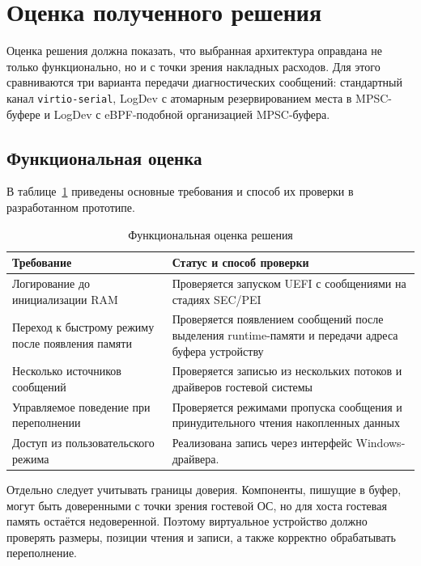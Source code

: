 \section{Оценка полученного решения}
\label{sec:Chapter5} 

Оценка решения должна показать, что выбранная архитектура оправдана не только
функционально, но и с точки зрения накладных расходов. Для этого сравниваются
три варианта передачи диагностических сообщений: стандартный канал
\texttt{virtio-serial}, LogDev с атомарным резервированием места в
MPSC-буфере и LogDev с eBPF-подобной организацией MPSC-буфера.

\subsection{Функциональная оценка}
\label{sec:ch5-functional}

В таблице~\ref{tab:functional-eval} приведены основные требования и способ их
проверки в разработанном прототипе.

\begin{table}[H]
    \centering
    \caption{Функциональная оценка решения}
    \label{tab:functional-eval}
    \small
    \begin{tabularx}{\textwidth}{|p{5.0cm}|>{\raggedright\arraybackslash}X|}
        \hline
        Требование & Статус и способ проверки \\
        \hline
        Логирование до инициализации RAM &
        Проверяется запуском UEFI с сообщениями на стадиях SEC/PEI \\
        \hline
        Переход к быстрому режиму после появления памяти &
        Проверяется появлением сообщений после выделения runtime-памяти и передачи адреса буфера устройству \\
        \hline
        Несколько источников сообщений &
        Проверяется записью из нескольких потоков и драйверов гостевой системы \\
        \hline
        Управляемое поведение при переполнении &
        Проверяется режимами пропуска сообщения и принудительного чтения накопленных данных \\
        \hline
        Доступ из пользовательского режима &
        Реализована запись через интерфейс Windows-драйвера. \\
        \hline
    \end{tabularx}
\end{table}

Отдельно следует учитывать границы доверия. Компоненты, пишущие в буфер, могут
быть доверенными с точки зрения гостевой ОС, но для хоста гостевая память
остаётся недоверенной. Поэтому виртуальное устройство должно проверять размеры,
позиции чтения и записи, а также корректно обрабатывать переполнение.

